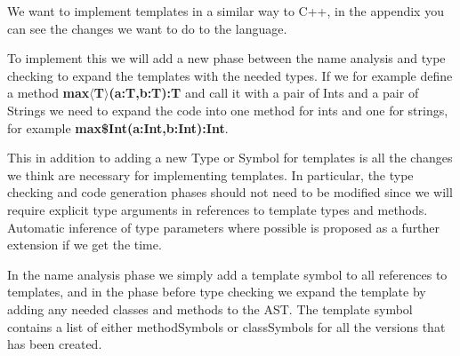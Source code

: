 We want to implement templates in a similar way to C++, in the appendix you can
see the changes we want to do to the language.

To implement this we will add a new phase between the name analysis and type
checking to expand the templates with the needed types. If we for example define
a method \textbf{max$\langle$T$\rangle$(a:T,b:T):T} and call it with a pair of
Ints and a pair of Strings we need to expand the code into one method for ints
and one for strings, for example \textbf{max\$Int(a:Int,b:Int):Int}.

This in addition to adding a new Type or Symbol for templates is all the
changes we think are necessary for implementing templates. In particular, the
type checking and code generation phases should not need to be modified since
we will require explicit type arguments in references to template types and
methods. Automatic inference of type parameters where possible is proposed as a
further extension if we get the time.

In the name analysis phase we simply add a template symbol to all references to
templates, and in the phase before type checking we expand the template by adding
any needed classes and methods to the AST. The template symbol contains a list of
either methodSymbols or classSymbols for all the versions that has been created.

\iffalse
The first thing our compiled does is checking whether the code compiles to
the BNF, this is done in two steps by first tokenizing the code into the
tokens found in our language, and then in the parser check whether the order
of the tokens are in complient with our language. We had to add some rules to
the BNF to make room for templates, the addition can be found in the appendix.
In the next part, name analysis we make sure that the code follows a set of rules
and attatch symbols to all identifiers. After the name analysis we run type
checking where we detect and make sure that all expressions produce the correct
type. To make this part work with templates we have to expand all templates
befor we run the type checking, and modify the symbols slighetly.
\fi
